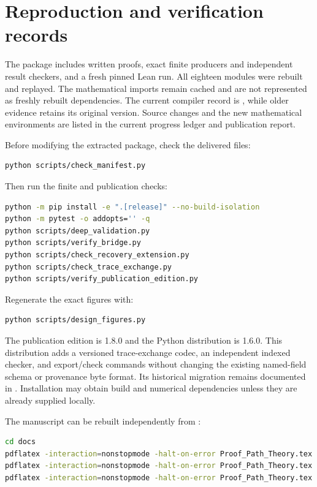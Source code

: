 \documentclass[11pt,oneside,openany]{book}
\numberwithin{equation}{section}
\begin{document}
\section{Reproduction and verification records}
\label{PPT:app:reproduction}

The package includes written proofs, exact finite producers and independent result checkers, and a fresh pinned Lean run. All eighteen modules were rebuilt and replayed. The mathematical imports remain cached and are not represented as freshly rebuilt dependencies. The current compiler record is , while older evidence retains its original version. Source changes and the new mathematical environments are listed in the current progress ledger and publication report.

Before modifying the extracted package, check the delivered files:
\begin{lstlisting}[language=bash]
python scripts/check_manifest.py
\end{lstlisting}
Then run the finite and publication checks:
\begin{lstlisting}[language=bash]
python -m pip install -e ".[release]" --no-build-isolation
python -m pytest -o addopts='' -q
python scripts/deep_validation.py
python scripts/verify_bridge.py
python scripts/check_recovery_extension.py
python scripts/check_trace_exchange.py
python scripts/verify_publication_edition.py
\end{lstlisting}

Regenerate the exact figures with:
\begin{lstlisting}[language=bash]
python scripts/design_figures.py
\end{lstlisting}
The publication edition is 1.8.0 and the Python distribution is 1.6.0. This distribution adds a versioned trace-exchange codec, an independent indexed checker, and export/check commands without changing the existing named-field schema or provenance byte format. Its historical migration remains documented in . Installation may obtain build and numerical dependencies unless they are already supplied locally.

The manuscript can be rebuilt independently from :
\begin{lstlisting}[language=bash]
cd docs
pdflatex -interaction=nonstopmode -halt-on-error Proof_Path_Theory.tex
pdflatex -interaction=nonstopmode -halt-on-error Proof_Path_Theory.tex
pdflatex -interaction=nonstopmode -halt-on-error Proof_Path_Theory.tex
\end{lstlisting}
\end{document}
